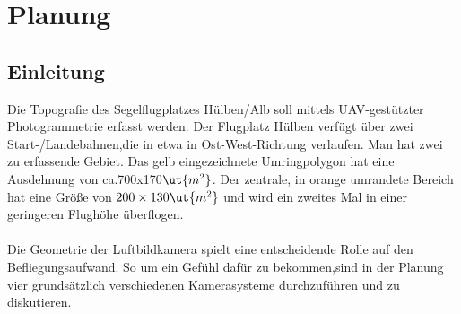 \chapter{Planung}
\section{Einleitung}
Die Topografie des Segelflugplatzes Hülben/Alb soll mittels UAV-gestützter Photogrammetrie erfasst werden. Der Flugplatz Hülben verfügt über zwei Start-/Landebahnen,die in etwa in Ost-West-Richtung verlaufen. Man hat zwei zu erfassende Gebiet. Das gelb eingezeichnete Umringpolygon hat eine Ausdehnung von ca.700x170$\ut{m^2}$. Der zentrale, in orange umrandete Bereich hat eine Größe
von $200 \times 130\ut{m^2}$ und wird ein zweites Mal in einer geringeren Flugh{\"{o}}he {\"{u}}berflogen.
\\\\
Die Geometrie der Luftbildkamera spielt eine entscheidende Rolle auf den Befliegungsaufwand. So um ein Gefühl dafür zu bekommen,sind in der Planung vier grundsätzlich verschiedenen Kamerasysteme durchzuführen und zu diskutieren.
\newpage
